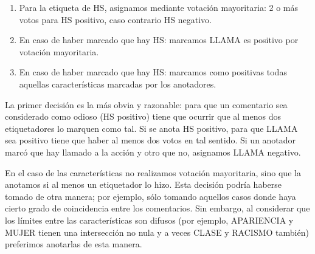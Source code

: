 \begin{enumerate}
    \item Para la etiqueta de HS, asignamos mediante votación mayoritaria: 2 o más votos para HS positivo, caso contrario HS negativo.
    \item En caso de haber marcado que hay HS: marcamos LLAMA es positivo por votación mayoritaria.
    \item En caso de haber marcado que hay HS: marcamos como positivas todas aquellas características marcadas por los anotadores.
\end{enumerate}

La primer decisión es la más obvia y razonable: para que un comentario sea considerado como odioso (HS positivo) tiene que ocurrir que al menos dos etiquetadores lo marquen como tal. Si se anota HS positivo, para que LLAMA sea positivo tiene que haber al menos dos votos en tal sentido. Si un anotador marcó que hay llamado a la acción y otro que no, asignamos LLAMA negativo.

En el caso de las características no realizamos votación mayoritaria, sino que la anotamos si al menos un etiquetador lo hizo. Esta decisión podría haberse tomado de otra manera; por ejemplo, sólo tomando aquellos casos donde haya cierto grado de coincidencia entre los comentarios. Sin embargo, al considerar que los límites entre las características son difusos (por ejemplo, APARIENCIA y MUJER tienen una intersección no nula y a veces CLASE y RACISMO también) preferimos anotarlas de esta manera.
